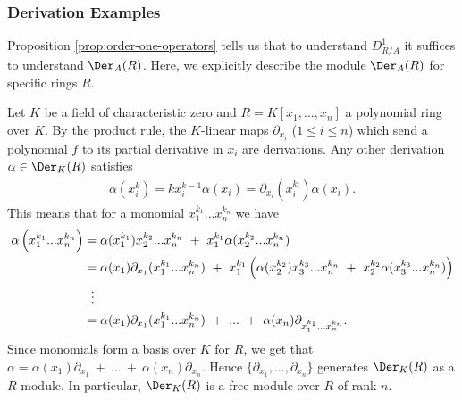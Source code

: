 \subsubsection{Derivation Examples}
Proposition \ref{prop:order-one-operators} tells us that to understand $D^1_{R/A}$ it suffices to understand $\Der_A(R)$. Here, we explicitly describe the module $\Der_A(R)$ for specific rings $R$.
\begin{example}\label{example:derivations-of-poly-ring}
	Let $K$ be a field of characteristic zero and $R = K[x_1,...,x_n]$ a polynomial ring over $K$. By the product rule, the $K$-linear maps $\partial_{x_i}$ ($1\leq i\leq n$) which send a polynomial $f$ to its partial derivative in $x_i$ are derivations. Any other derivation $\alpha \in \Der_K(R)$ satisfies 
	\begin{align*}
		\alpha(x_i^k) = kx_i^{k-1}\alpha(x_i) = \partial_{x_i}(x_i^{k_i})\alpha(x_i).
	\end{align*}
	This means that for a monomial $x_1^{k_1}...x_n^{k_n}$ we have
	\begin{align*}
		\alpha \left(x_1^{k_1}...x_n^{k_n}\right) 
		  &= \alpha(x_1^{k_1})x_2^{k_2}...x_n^{k_n} ~+~ x_1^{k_1}\alpha(x_2^{k_2}...x_n^{k_n}) \\
		  &= \alpha(x_1)\partial_{x_1}(x_1^{k_1}...x_n^{k_n}) ~+~ x_1^{k_1}\left(\alpha(x_2^{k_2})x_3^{k_3}...x_n^{k_n} ~+~ x_2^{k_2}\alpha(x_3^{k_3}...x_n^{k_n})\right) \\
		  &\hspace{0.6em}\vdots \\
		  &= \alpha(x_1)\partial_{x_1}(x_1^{k_1}...x_n^{k_n}) ~+~ ... ~+~ \alpha(x_n)\partial_{x_1^{k_1}...x_n^{k_n}}.
	\end{align*}
	Since monomials form a basis over $K$ for $R$, we get that $\alpha = \alpha(x_1)\partial_{x_1}~+~...~+~\alpha(x_n)\partial_{x_n}$. Hence $\{\partial_{x_1},...,\partial_{x_n}\}$ generates $\Der_K(R)$ as a $R$-module. In particular, $\Der_K(R)$ is a free-module over $R$ of rank $n$.
\end{example}
